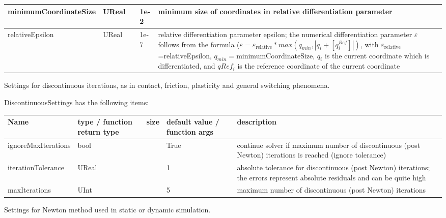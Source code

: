 \begin{center}
\begin{longtable}{| p{4.2cm} | p{2.5cm} | p{0.3cm} | p{3.0cm} | p{6cm} |}
    minimumCoordinateSize &     UReal &      &     1e-2 &     minimum size of coordinates in relative differentiation parameter\\ \hline
    relativeEpsilon &     UReal &      &     1e-7 &     relative differentiation parameter epsilon; the numerical differentiation parameter $\varepsilon$ follows from the formula ($\varepsilon = \varepsilon_\mathrm{relative}*max(q_{min}, |q_i + [q^{Ref}_i]|)$, with $\varepsilon_\mathrm{relative}$=relativeEpsilon, $q_{min} = $minimumCoordinateSize, $q_i$ is the current coordinate which is differentiated, and $qRef_i$ is the reference coordinate of the current coordinate\\ \hline
	  \end{longtable}
	\end{center}



\label{sec:DiscontinuousSettings}
Settings for discontinuous iterations, as in contact, friction, plasticity and general switching phenomena.

\noindent DiscontinuousSettings has the following items:
\begin{center}
  \footnotesize
  \begin{longtable}{| p{4.2cm} | p{2.5cm} | p{0.3cm} | p{3.0cm} | p{6cm} |}
    \hline
    \bf Name & \bf type / function return type & \bf size & \bf default value / function args & \bf description \\ \hline
    ignoreMaxIterations &     bool &      &     True &     continue solver if maximum number of discontinuous (post Newton) iterations is reached (ignore tolerance)\\ \hline
    iterationTolerance &     UReal &      &     1 &     absolute tolerance for discontinuous (post Newton) iterations; the errors represent absolute residuals and can be quite high\\ \hline
    maxIterations &     UInt &      &     5 &     maximum number of discontinuous (post Newton) iterations\\ \hline
	  \end{longtable}
	\end{center}



\label{sec:NewtonSettings}
Settings for Newton method used in static or dynamic simulation.

